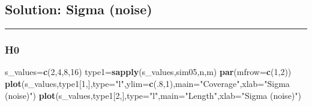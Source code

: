 \documentclass[]{article}
\newenvironment{Shaded}{\begin{snugshade}}{\end{snugshade}}
\newcommand{\KeywordTok}[1]{\textcolor[rgb]{0.13,0.29,0.53}{\textbf{#1}}}
\newcommand{\DataTypeTok}[1]{\textcolor[rgb]{0.13,0.29,0.53}{#1}}
\newcommand{\DecValTok}[1]{\textcolor[rgb]{0.00,0.00,0.81}{#1}}
\newcommand{\StringTok}[1]{\textcolor[rgb]{0.31,0.60,0.02}{#1}}
\newcommand{\CommentTok}[1]{\textcolor[rgb]{0.56,0.35,0.01}{\textit{#1}}}
\newcommand{\OtherTok}[1]{\textcolor[rgb]{0.56,0.35,0.01}{#1}}
\newcommand{\ControlFlowTok}[1]{\textcolor[rgb]{0.13,0.29,0.53}{\textbf{#1}}}
\newcommand{\OperatorTok}[1]{\textcolor[rgb]{0.81,0.36,0.00}{\textbf{#1}}}
\newcommand{\NormalTok}[1]{#1}
\begin{document}
\subsection{Solution: Sigma (noise)}\label{solution-sigma-noise}

\begin{Shaded}
\end{Shaded}

\begin{center}\rule{0.5\linewidth}{\linethickness}\end{center}

\subsubsection{H0}\label{h0-1}

\begin{Shaded}
\begin{Highlighting}[]
\NormalTok{s_values=}\KeywordTok{c}\NormalTok{(}\DecValTok{2}\NormalTok{,}\DecValTok{4}\NormalTok{,}\DecValTok{8}\NormalTok{,}\DecValTok{16}\NormalTok{)}
\NormalTok{type1=}\KeywordTok{sapply}\NormalTok{(s_values,sim05,n,m)}
\KeywordTok{par}\NormalTok{(}\DataTypeTok{mfrow=}\KeywordTok{c}\NormalTok{(}\DecValTok{1}\NormalTok{,}\DecValTok{2}\NormalTok{))}
\KeywordTok{plot}\NormalTok{(s_values,type1[}\DecValTok{1}\NormalTok{,],}\DataTypeTok{type=}\StringTok{"l"}\NormalTok{,}\DataTypeTok{ylim=}\KeywordTok{c}\NormalTok{(.}\DecValTok{8}\NormalTok{,}\DecValTok{1}\NormalTok{),}\DataTypeTok{main=}\StringTok{"Coverage"}\NormalTok{,}\DataTypeTok{xlab=}\StringTok{"Sigma (noise)"}\NormalTok{)}
\KeywordTok{plot}\NormalTok{(s_values,type1[}\DecValTok{2}\NormalTok{,],}\DataTypeTok{type=}\StringTok{"l"}\NormalTok{,}\DataTypeTok{main=}\StringTok{"Length"}\NormalTok{,}\DataTypeTok{xlab=}\StringTok{"Sigma (noise)"}\NormalTok{)}
\end{Highlighting}
\end{Shaded}
\end{document}
